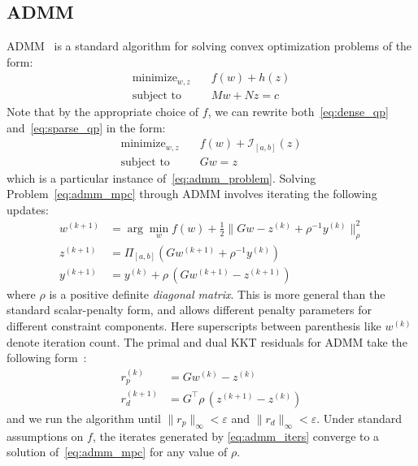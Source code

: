 \documentclass[letterpaper, 10 pt, conference]{ieeeconf}  %
\DeclareMathOperator*{\minimize}{minimize}
\begin{document}
\subsection{ADMM}
ADMM~\cite{boyd_admm} is a standard algorithm for solving convex optimization problems of the form:
\begin{equation}
\label{eq:admm_problem}
\begin{aligned}
    \minimize_{w,z} &\quad f(w) + h(z) \\
    \text{subject to} &\quad M w + N z = c
\end{aligned}
\end{equation}
Note that by the appropriate choice of $f$, we can rewrite both~\eqref{eq:dense_qp} and~\eqref{eq:sparse_qp} in the form:
\begin{equation}
\label{eq:admm_mpc}
\begin{aligned}
    \minimize_{w,z} &\quad f(w) + \mathcal{I}_{[a,b]}(z) \\
    \text{subject to} &\quad Gw = z
\end{aligned}
\end{equation}
which is a particular instance of~\eqref{eq:admm_problem}. Solving Problem~\eqref{eq:admm_mpc} through ADMM involves iterating the following updates:
\begin{equation}
\label{eq:admm_iters}
\begin{aligned}
w^{(k+1)} &= \arg \min_w f(w) + \frac{1}{2} \| Gw - z^{(k)} + \rho^{-1} y^{(k)}\|_{\rho}^2 \\
z^{(k+1)} &= \Pi_{[a,b]} \left(Gw^{(k+1)} + \rho^{-1} y^{(k)} \right) \\
y^{(k+1)} &= y^{(k)} + \rho\, (G w^{(k+1)} - z^{(k+1)})
\end{aligned}
\end{equation}
where $\rho$ is a positive definite \emph{diagonal matrix}. This is more general than the standard scalar-penalty form, and allows different penalty parameters for different constraint components. 
Here superscripts between parenthesis like $w^{(k)}$ denote iteration count. The primal and dual KKT residuals for ADMM take the following form~\cite{boyd_admm}:
\begin{equation}
\label{eq:residuals}
\begin{aligned}
r_p^{(k)} &= G w^{(k)} - z^{(k)} \\
r_d^{(k+1)} &= G^{\top} \rho\, (z^{(k+1)} - z^{(k)})
\end{aligned}
\end{equation}
and we run the algorithm until $\|r_p \|_{\infty} < \varepsilon$ and $\|r_d \|_{\infty} < \varepsilon$. Under standard assumptions on $f$, the iterates generated by \eqref{eq:admm_iters} converge to a solution of~\eqref{eq:admm_mpc} for any value of $\rho$.
\end{document}
